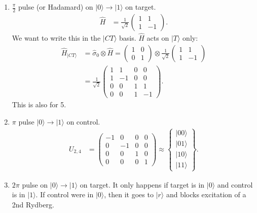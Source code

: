 \documentclass[a4paper, 11pt, normalem]{report}
\begin{document}
\begin{enumerate}
    \item $\frac{\pi}{2}$ pulse (or Hadamard) on $|0\rangle\to|1\rangle$ on target.
        \begin{align}
            \hat{H} &= \frac{1}{\sqrt{2}} \begin{pmatrix} 1 & 1 \\ 1 & -1\end{pmatrix}.
        \end{align}
        We want to write this in the $|CT\rangle$ basis.
        $\hat{H}$ acts on $|T\rangle$ only:
        \begin{align}
            \hat{H}_{|CT\rangle} &= \hat{\sigma}_0\otimes\hat{H} = \begin{pmatrix}1&0\\0&1\end{pmatrix} \otimes \frac{1}{\sqrt{2}}\begin{pmatrix} 1 & 1 \\ 1 & -1 \end{pmatrix} \\
                                 &= \frac{1}{\sqrt{2}}\begin{pmatrix} 1 & 1 & 0 & 0 \\ 1 & -1 & 0 & 0 \\ 0 & 0 & 1 & 1 \\ 0 & 0 & 1 & -1\end{pmatrix}.
        \end{align}
        This is also for 5.
    \item $\pi$ pulse $|0\rangle\to|1\rangle$ on control.
        \begin{align}
            U_{2,4} &= \begin{pmatrix} -1 &0&0&0\\ 0&-1&0&0\\ 0&0&1&0 \\ 0&0&0&1\end{pmatrix} \approx \begin{Bmatrix} |00\rangle \\ |01\rangle \\ |10\rangle \\ |11\rangle\end{Bmatrix}.
        \end{align}
    \item $2\pi$ pulse on $|0\rangle\to|1\rangle$ on target.
        It only happens if target is in $|0\rangle$ and control is in $|1\rangle$.
        If control were in $|0\rangle$, then it goes to $|r\rangle$ and blocks excitation of a 2nd Rydberg.

\end{enumerate}
\end{document}
